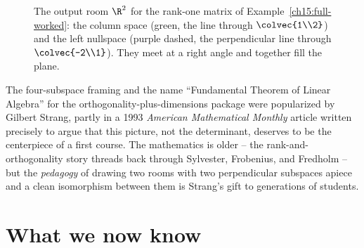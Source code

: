 \begin{figure}[H]
\centering
{}
\caption{The output room $\R^2$ for the rank-one matrix of
Example~\ref{ch15:full-worked}: the column space (green, the line through
$\protect\colvec{1\\2}$) and the left nullspace (purple dashed, the perpendicular line through
$\protect\colvec{-2\\1}$). They meet at a right angle and together fill the plane.}
\label{ch15:rank1-room}
\end{figure}

\begin{historybox}
The four-subspace framing and the name ``Fundamental Theorem of Linear Algebra'' for the
orthogonality-plus-dimensions package were popularized by Gilbert Strang, partly in a 1993
\emph{American Mathematical Monthly} article written precisely to argue that this picture, not the
determinant, deserves to be the centerpiece of a first course. The mathematics is older -- the
rank-and-orthogonality story threads back through Sylvester, Frobenius, and Fredholm -- but the
\emph{pedagogy} of drawing two rooms with two perpendicular subspaces apiece and a clean
isomorphism between them is Strang's gift to generations of students.
\end{historybox}

\section{What we now know}

